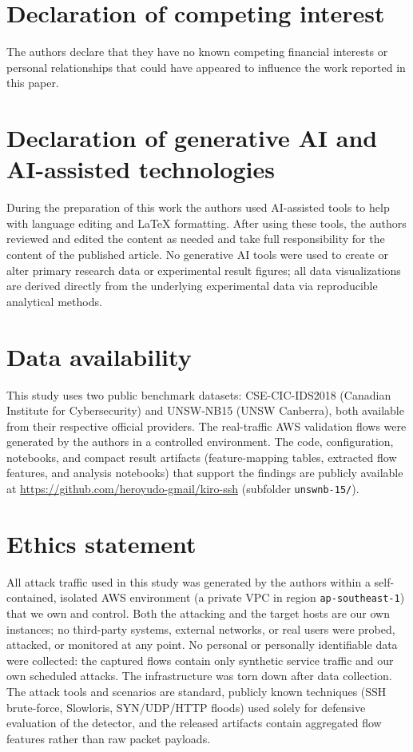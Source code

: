 \documentclass[preprint,12pt,authoryear]{elsarticle}
\begin{document}
\section*{Declaration of competing interest}
The authors declare that they have no known competing financial interests or
personal relationships that could have appeared to influence the work reported in
this paper.

\section*{Declaration of generative AI and AI-assisted technologies}
During the preparation of this work the authors used AI-assisted tools to help
with language editing and LaTeX formatting. After using these tools, the authors
reviewed and edited the content as needed and take full responsibility for the
content of the published article. No generative AI tools were used to create or
alter primary research data or experimental result figures; all data
visualizations are derived directly from the underlying experimental data via
reproducible analytical methods.

\section*{Data availability}
This study uses two public benchmark datasets: CSE-CIC-IDS2018 (Canadian Institute
for Cybersecurity) and UNSW-NB15 (UNSW Canberra), both available from their
respective official providers. The real-traffic AWS validation flows were
generated by the authors in a controlled environment. The code, configuration,
notebooks, and compact result artifacts (feature-mapping tables, extracted flow
features, and analysis notebooks) that support the findings are publicly available
at \url{https://github.com/heroyudo-gmail/kiro-ssh} (subfolder \texttt{unswnb-15/}).

\section*{Ethics statement}
All attack traffic used in this study was generated by the authors within a
self-contained, isolated AWS environment (a private VPC in region
\texttt{ap-southeast-1}) that we own and control. Both the attacking and the target
hosts are our own instances; no third-party systems, external networks, or real
users were probed, attacked, or monitored at any point. No personal or personally
identifiable data were collected: the captured flows contain only synthetic
service traffic and our own scheduled attacks. The infrastructure was torn down
after data collection. The attack tools and scenarios are standard, publicly known
techniques (SSH brute-force, Slowloris, SYN/UDP/HTTP floods) used solely for
defensive evaluation of the detector, and the released artifacts contain aggregated
flow features rather than raw packet payloads.
\end{document}
